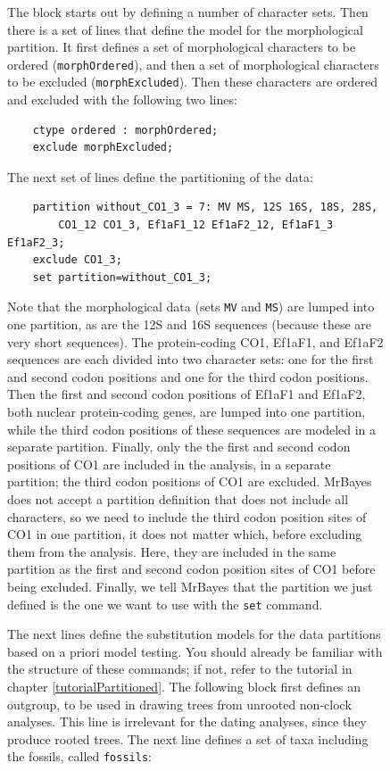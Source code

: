 \documentclass[12pt]{book}
\newcommand{\ttt}[1]{\texttt{#1}}
\begin{document}
\begin{figure}[h]
The block starts out by defining a number of character sets. Then there is a set of lines that
define the model for the morphological partition. It first defines a set of morphological
characters to be ordered (\ttt{morphOrdered}), and then a set of morphological characters to be
excluded (\ttt{morphExcluded}). Then these characters are ordered and excluded with the following
two lines:

\small
\begin{singlespacing}
\begin{verbatim}
    ctype ordered : morphOrdered;
    exclude morphExcluded;
\end{verbatim}
\end{singlespacing}
\normalsize

The next set of lines define the partitioning of the data:

\small
\begin{singlespacing}
\begin{verbatim}
    partition without_CO1_3 = 7: MV MS, 12S 16S, 18S, 28S,
        CO1_12 CO1_3, Ef1aF1_12 Ef1aF2_12, Ef1aF1_3 Ef1aF2_3;
    exclude CO1_3;
    set partition=without_CO1_3;
\end{verbatim}
\end{singlespacing}
\normalsize

Note that the morphological data (sets \ttt{MV} and \ttt{MS}) are lumped into one partition, as are
the 12S and 16S sequences (because these are very short sequences). The protein-coding CO1, Ef1aF1,
and Ef1aF2 sequences are each divided into two character sets: one for the first and second codon
positions and one for the third codon positions. Then the first and second codon positions of
Ef1aF1 and Ef1aF2, both nuclear protein-coding genes, are lumped into one partition, while the
third codon positions of these sequences are modeled in a separate partition. Finally, only the the
first and second codon positions of CO1 are included in the analysis, in a separate partition; the
third codon positions of CO1 are excluded. MrBayes does not accept a partition definition that does
not include all characters, so we need to include the third codon position sites of CO1 in one
partition, it does not matter which, before excluding them from the analysis. Here, they are
included in the same partition as the first and second codon position sites of CO1 before being
excluded. Finally, we tell MrBayes that the partition we just defined is the one we want to use
with the \ttt{set} command.

The next lines define the substitution models for the data partitions based on a priori model
testing. You should already be familiar with the structure of these commands; if not, refer to the
tutorial in chapter \ref{tutorialPartitioned}. The following block first defines an outgroup, to be
used in drawing trees from unrooted non-clock analyses. This line is irrelevant for the dating
analyses, since they produce rooted trees. The next line defines a set of taxa including the
fossils, called \ttt{fossils}:


\end{figure}
\end{document}

